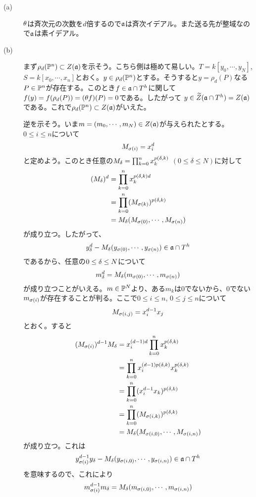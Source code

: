 \begin{description}
  \item[(a)] $\grt$は斉次元の次数を$d$倍するので$\fraka$は斉次イデアル。また送る先が整域なので$\fraka$は素イデアル。
  \item[(b)] まず$\rho_d(\P^n) \subset Z(\fraka)$を示そう。こちら側は極めて易しい。$T = k[y_0, \cdots , y_N]$, $S=k[x_0, \cdots , x_n]$とおく。$y \in \rho_d(\P^n)$とする。そうすると$y=\rho_d(P)$なる$P \in \P^n$が存在する。このとき$f \in \fraka \cap T^h$に関して$f(y)=f(\rho_d(P))=(\grt f)(P)= 0$である。したがって
  $y \in \wt{Z}(\fraka \cap T^h) = Z(\fraka)$である。これで$\rho_d(\P^n) \subset Z(\fraka)$がいえた。

  逆を示そう。いま$m = (m_0, \cdots , m_N) \in Z(\fraka)$が与えられたとする。$0 \leq i \leq n$について
  \[
   M_{\grs(i)}=x_i^d
  \]
  と定めよう。このとき任意の$M_{\grd} = \prod_{k=0}^n x_k^{p(\grd, k)}$ $(0 \leq \delta \leq N)$に対して
  \begin{align*}
    (M_{\grd})^d &= \prod_{k=0}^n x_k^{p(\grd, k)d } \\
    &= \prod_{k=0}^n (M_{\grs(k)})^{p(\grd, k)} \\
    &= M_{\grd}(M_{\grs(0)}, \cdots , M_{\grs(n)} )
  \end{align*}
  が成り立つ。したがって、
  \[
  y_{\grd}^d - M_{\grd}(y_{\grs(0)}, \cdots , y_{\grs(n)}) \in \fraka \cap T^h
  \]
  であるから、任意の$0 \leq \grd \leq N$について
  \[
    m_{\grd}^d = M_{\grd}(m_{\grs(0)}, \cdots , m_{\grs(n)})
  \]
  が成り立つことがいえる。$m \in \P^N$より、ある$m_k$は$0$でないから、$0$でない$m_{\grs(i)}$が存在することが判る。ここで$0 \leq i \leq n$, $0 \leq j \leq n$について
  \[
M_{\grs(i,j)}=x_i^{d-1}x_j
  \]
  とおく。すると
  \begin{align*}
    (M_{\grs(i)})^{d-1}M_{\grd} &= x_i^{(d-1)d} \prod_{k=0}^n x_k^{p(\grd, k)} \\
    &= \prod_{k=0}^n x_i^{(d-1)p(\grd,k)} x_k^{p(\grd, k)} \\
    &= \prod_{k=0}^n (x_i^{d-1}x_k)^{p(\grd, k)} \\
    &= \prod_{k=0}^n (M_{\grs(i,k)})^{p(\grd, k)} \\
    &= M_{\grd}(M_{\grs(i,0)}, \cdots , M_{\grs(i,n)})
  \end{align*}
  が成り立つ。これは
  \[
  y_{\grs(i)}^{d-1}y_{\grd} - M_{\grd}(y_{\grs(i,0)} , \cdots , y_{\grs(i,n)}) \in \fraka \cap T^h
  \]
  を意味するので、これにより
  \[
  m_{\grs(i)}^{d-1}m_{\grd} = M_{\grd}(m_{\grs(i,0)} , \cdots , m_{\grs(i,n)})
\]
\end{description}
